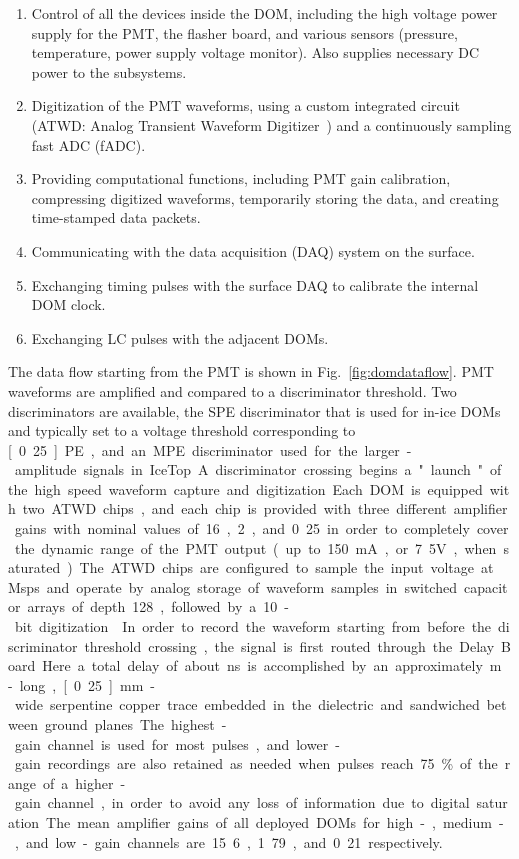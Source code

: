 \begin{enumerate}
\item{Control of all the devices inside the DOM, including the high voltage power supply for the PMT, 
the flasher board, and various sensors (pressure, temperature, power supply voltage monitor). 
Also supplies necessary DC power to the subsystems.}
\item{Digitization of the PMT waveforms, using a custom integrated circuit (ATWD: Analog
  Transient Waveform Digitizer~\cite{ICECUBE:DAQ}) and a continuously sampling fast ADC (fADC).}
\item{Providing computational functions, including PMT gain calibration, compressing 
digitized waveforms, temporarily storing the data, and creating time-stamped data packets.}
\item{Communicating with the data acquisition (DAQ) system on the surface.}
\item{Exchanging timing pulses with the surface DAQ to calibrate the internal DOM clock. }
\item{Exchanging LC pulses with the adjacent DOMs.}
\end{enumerate}

The data flow starting from the PMT is shown in Fig.~\ref{fig:domdataflow}.
PMT waveforms are amplified and compared to a discriminator threshold.  Two
discriminators are available, the SPE discriminator that is used for in-ice DOMs
and typically set to a voltage threshold corresponding to \unit[0.25]PE,
and an MPE discriminator used for the larger-amplitude signals in IceTop.
A discriminator crossing begins a "launch" of the high speed waveform
capture and digitization. Each DOM is equipped with two ATWD chips,
and each chip is provided with three different amplifier
gains with nominal values of 16, 2, and 0.25 in order to completely cover the 
dynamic range of the PMT output (up to 150~mA, or 7.5V, when saturated). 
The ATWD chips are configured to sample the input voltage at \unit[300]Msps
and operate by analog storage of waveform samples in switched capacitor arrays of depth 128,
followed by a 10-bit digitization \cite{atwd}.  In order to record the waveform starting from before the discriminator
threshold crossing, the signal is first routed through the Delay Board.  Here a total delay of about
\unit[75]ns is accomplished by an approximately \unit[10]m-long, \unit[0.25]mm-wide
serpentine copper trace embedded in the dielectric and sandwiched between
ground planes.  The highest-gain channel is used
for most pulses, and lower-gain recordings are also retained as needed when pulses reach 75\% of the range 
of a higher-gain channel, in order to avoid any loss of information due to
digital saturation.  The mean amplifier gains of all deployed DOMs for high-,
medium-, and low-gain channels are 15.6, 1.79, and 0.21 respectively.


